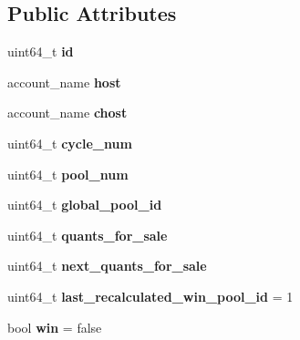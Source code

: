 \subsection*{Public Attributes}
\begin{DoxyCompactItemize}
\item 
\mbox{\label{structeosio_1_1balance_a4108c954aff6120398b436af885ee1e5}} 
uint64\+\_\+t {\bfseries id}
\item 
\mbox{\label{structeosio_1_1balance_a0d48a0adcde0e8ab512796c9306ba458}} 
account\+\_\+name {\bfseries host}
\item 
\mbox{\label{structeosio_1_1balance_a5b73e896d8d4f4a34635b5b7745bd2ac}} 
account\+\_\+name {\bfseries chost}
\item 
\mbox{\label{structeosio_1_1balance_a577c2d96a70ba2520e25f6a6f1e557e9}} 
uint64\+\_\+t {\bfseries cycle\+\_\+num}
\item 
\mbox{\label{structeosio_1_1balance_a437ab45da62708b7facd1a78916d2e75}} 
uint64\+\_\+t {\bfseries pool\+\_\+num}
\item 
\mbox{\label{structeosio_1_1balance_a5632af7bc642b2594f060af98d8f3186}} 
uint64\+\_\+t {\bfseries global\+\_\+pool\+\_\+id}
\item 
\mbox{\label{structeosio_1_1balance_a8ee4d417c434002c55195416dd98dc02}} 
uint64\+\_\+t {\bfseries quants\+\_\+for\+\_\+sale}
\item 
\mbox{\label{structeosio_1_1balance_a7450d3b30e811d9f617626b8c1b37b41}} 
uint64\+\_\+t {\bfseries next\+\_\+quants\+\_\+for\+\_\+sale}
\item 
\mbox{\label{structeosio_1_1balance_a1957d8b4780f9abe37c8dabc96ca2d9d}} 
uint64\+\_\+t {\bfseries last\+\_\+recalculated\+\_\+win\+\_\+pool\+\_\+id} = 1
\item 
\mbox{\label{structeosio_1_1balance_ab01386c95561f01922cca3f6b365e2bb}} 
bool {\bfseries win} = false

\end{DoxyCompactItemize}
